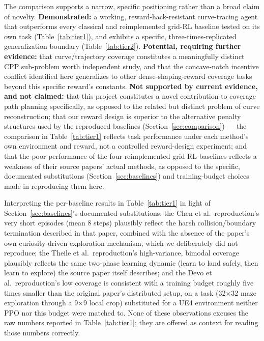 \documentclass[conference]{IEEEtran}
\begin{document}
The comparison supports a narrow, specific positioning rather than a broad claim of novelty. \textbf{Demonstrated:} a working, reward-hack-resistant curve-tracing agent that outperforms every classical and reimplemented grid-RL baseline tested on its own task (Table~\ref{tab:tier1}), and exhibits a specific, three-times-replicated generalization boundary (Table~\ref{tab:tier2}). \textbf{Potential, requiring further evidence:} that curve/trajectory coverage constitutes a meaningfully distinct CPP sub-problem worth independent study, and that the concave-notch incentive conflict identified here generalizes to other dense-shaping-reward coverage tasks beyond this specific reward's constants. \textbf{Not supported by current evidence, and not claimed:} that this project constitutes a novel contribution to coverage path planning specifically, as opposed to the related but distinct problem of curve reconstruction; that our reward design is superior to the alternative penalty structures used by the reproduced baselines (Section~\ref{sec:comparison}) --- the comparison in Table~\ref{tab:tier1} reflects task performance under each method's own environment and reward, not a controlled reward-design experiment; and that the poor performance of the four reimplemented grid-RL baselines reflects a weakness of their source papers' actual methods, as opposed to the specific, documented substitutions (Section~\ref{sec:baselines}) and training-budget choices made in reproducing them here.

Interpreting the per-baseline results in Table~\ref{tab:tier1} in light of Section~\ref{sec:baselines}'s documented substitutions: the Chen et al.\ reproduction's very short episodes (mean 8 steps) plausibly reflect the harsh collision/boundary termination described in that paper, combined with the absence of the paper's own curiosity-driven exploration mechanism, which we deliberately did not reproduce; the Theile et al.\ reproduction's high-variance, bimodal coverage plausibly reflects the same two-phase learning dynamic (learn to land safely, then learn to explore) the source paper itself describes; and the Devo et al.\ reproduction's low coverage is consistent with a training budget roughly five times smaller than the original paper's distributed setup, on a task (32$\times$32 maze exploration through a 9$\times$9 local crop) substituted for a UE4 environment neither PPO nor this budget were matched to. None of these observations excuses the raw numbers reported in Table~\ref{tab:tier1}; they are offered as context for reading those numbers correctly.
\end{document}
